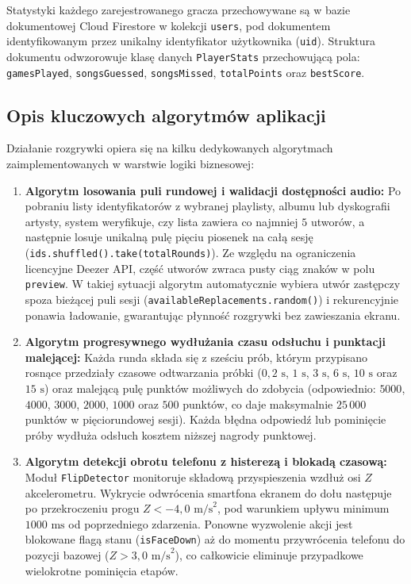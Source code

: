 \hspace{0.60cm}Statystyki każdego zarejestrowanego gracza przechowywane są w bazie dokumentowej Cloud Firestore w kolekcji \texttt{users}, pod dokumentem identyfikowanym przez unikalny identyfikator użytkownika (\texttt{uid}). Struktura dokumentu odwzorowuje klasę danych \texttt{PlayerStats} przechowującą pola: \texttt{gamesPlayed}, \texttt{songsGuessed}, \texttt{songsMissed}, \texttt{totalPoints} oraz \texttt{bestScore}.

\subsection{Opis kluczowych algorytmów aplikacji}

\hspace{0.60cm}Działanie rozgrywki opiera się na kilku dedykowanych algorytmach zaimplementowanych w warstwie logiki biznesowej:

\begin{enumerate}
    \item \textbf{Algorytm losowania puli rundowej i walidacji dostępności audio:} Po pobraniu listy identyfikatorów z wybranej playlisty, albumu lub dyskografii artysty, system weryfikuje, czy lista zawiera co najmniej $5$ utworów, a następnie losuje unikalną pulę pięciu piosenek na całą sesję (\texttt{ids.shuffled().take(totalRounds)}). Ze względu na ograniczenia licencyjne Deezer API, część utworów zwraca pusty ciąg znaków w polu \texttt{preview}. W takiej sytuacji algorytm automatycznie wybiera utwór zastępczy spoza bieżącej puli sesji (\texttt{availableReplacements.random()}) i rekurencyjnie ponawia ładowanie, gwarantując płynność rozgrywki bez zawieszania ekranu.
    
    \item \textbf{Algorytm progresywnego wydłużania czasu odsłuchu i punktacji malejącej:} Każda runda składa się z sześciu prób, którym przypisano rosnące przedziały czasowe odtwarzania próbki ($0,2\text{ s}$, $1\text{ s}$, $3\text{ s}$, $6\text{ s}$, $10\text{ s}$ oraz $15\text{ s}$) oraz malejącą pulę punktów możliwych do zdobycia (odpowiednio: $5000$, $4000$, $3000$, $2000$, $1000$ oraz $500$ punktów, co daje maksymalnie $25\,000$ punktów w pięciorundowej sesji). Każda błędna odpowiedź lub pominięcie próby wydłuża odsłuch kosztem niższej nagrody punktowej.
    
    \item \textbf{Algorytm detekcji obrotu telefonu z histerezą i blokadą czasową:} Moduł \texttt{FlipDetector} monitoruje składową przyspieszenia wzdłuż osi $Z$ akcelerometru. Wykrycie odwrócenia smartfona ekranem do dołu następuje po przekroczeniu progu $Z < -4,0\text{ m/s}^2$, pod warunkiem upływu minimum $1000\text{ ms}$ od poprzedniego zdarzenia. Ponowne wyzwolenie akcji jest blokowane flagą stanu (\texttt{isFaceDown}) aż do momentu przywrócenia telefonu do pozycji bazowej ($Z > 3,0\text{ m/s}^2$), co całkowicie eliminuje przypadkowe wielokrotne pominięcia etapów.
\end{enumerate}
